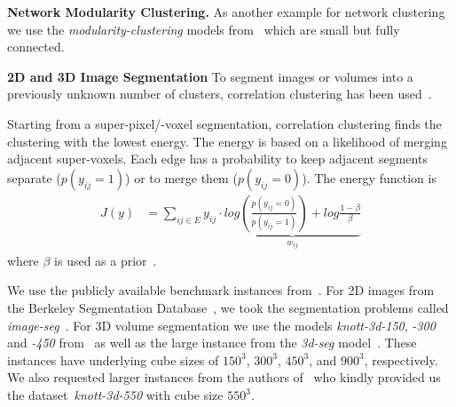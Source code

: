 \textbf{Network Modularity Clustering.}
As another example for network clustering we use the \emph{modularity-clustering} models from~\cite{kappes_2014_benchmark_arxiv} which are small but fully connected.

\textbf{2D and 3D Image Segmentation}\label{sec:imseg}
To segment images or volumes into a previously
unknown number of clusters, correlation clustering
has been used~\cite{andres_2011_iccv,kroeger_2012_eccv}.

Starting from a super-pixel/-voxel segmentation,
correlation clustering finds the clustering with the lowest energy.
The energy is based on a likelihood of merging adjacent super-voxels.
Each edge has a probability to keep adjacent segments separate ($p(y_{ij} =1)$)
or to merge them ($p(y_{ij} = 0)$).
The energy function is
\begin{align}
 J(y)  &= \sum_{ij \in E} y_{ij}\cdot \underbrace{  log\left( \frac{p(y_{ij} =0)}{p(y_{ij} =1)}\right) + log \frac{1-\beta}{\beta}  }_{w_{ij}}
\end{align}
where $\beta$ is used as a prior~\cite{andres_2011_iccv}.

We use the publicly available benchmark instances from~\cite{kappes_2013_benchmark_cvpr,kappes_2014_benchmark_arxiv}.
For 2D images from the Berkeley Segmentation Database~\cite{martin_2001}, we took the segmentation problems called \emph{image-seg}~\cite{andres_2011_iccv,kappes_2013_benchmark_cvpr}.
For 3D volume segmentation we use the models \emph{knott-3d-150}, \emph{-300} and \emph{-450} from~\cite{kroeger_2012_eccv,kappes_2014_benchmark_arxiv} as well as the large
instance from the \emph{3d-seg} model~\cite{andres_2011_iccv,kappes_2013_benchmark_cvpr}. These instances have underlying cube sizes of  $150^3$, $300^3$, $450^3$, and $900^3$, respectively.
We also requested larger instances from the authors of~\cite{kroeger_2012_eccv} who kindly provided us the dataset~\emph{knott-3d-550} with cube size  $550^3$.
